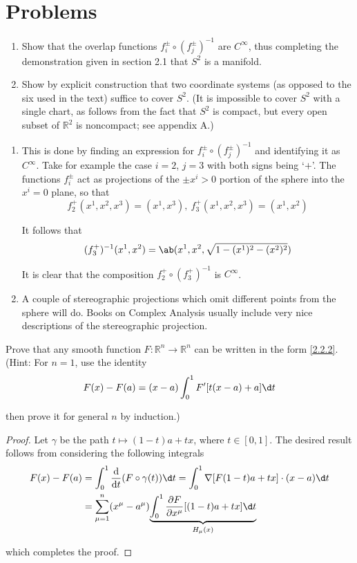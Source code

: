 \section*{Problems}
\begin{problem}\leavevmode
    \begin{enumerate}[label=(\alph*)]
        \item Show that the overlap functions $f_i^\pm\circ(f_j^\pm)^{-1}$ are $C^\infty$, thus completing the demonstration given in section 2.1 that $S^2$ is a manifold.
        \item Show by explicit construction that two coordinate systems (as opposed to the six used in the text) suffice to cover $S^2$. (It is impossible to cover $S^2$ with a single chart, as follows from the fact that $S^2$ is compact, but every open subset of $\mathbb{R}^2$ is noncompact; see appendix A.)
    \end{enumerate}
\end{problem}
\begin{solution}\leavevmode
    \begin{enumerate}[label=(\alph*)]
        \item This is done by finding an expression for $f_i^\pm\circ(f_j^\pm)^{-1}$ and identifying it as $C^\infty$. Take for example the case $i = 2$, $j = 3$ with both signs being `$+$'. The functions $f_i^\pm$ act as projections of the $\pm x^i>0$ portion of the sphere into the $x^i = 0$ plane, so that
        \[f_2^+(x^1,x^2,x^3)=(x^1,x^3),\ f_3^+(x^1,x^2,x^3)=(x^1,x^2)\]

        It follows that
        \[(f_3^+)^{-1}(x^1,x^2)=\ab(x^1,x^2,\sqrt{1-(x^1)^2-(x^2)^2})\]

        It is clear that the composition $f_2^+\circ(f_3^+)^{-1}$ is $C^\infty$.
        \item A couple of stereographic projections which omit different points from the sphere will do. Books on Complex Analysis usually include very nice descriptions of the stereographic projection.
    \end{enumerate}
\end{solution}

\begin{problem}
    Prove that any smooth function $F:\mathbb{R}^n\to\mathbb{R}^n$ can be written in the form \eqref{2.2.2}. (Hint: For $n = 1$, use the identity
    \[F(x)-F(a)=(x-a)\int_0^1F'[t(x-a)+a]\d t\]

    then prove it for general $n$ by induction.)
\end{problem}
\begin{proof}
    Let $\gamma$ be the path $t\longmapsto(1-t)a+tx$, where $t\in[0,1]$. The desired result follows from considering the following integrals
    \[\begin{aligned}
        F(x)-F(a)&=\int_0^1\odv{}t(F\circ\gamma(t))\d t=\int_0^1\nabla[F(1-t)a+tx]\cdot(x-a)\d t\\
        &=\sum_{\mu=1}^n(x^\mu-a^\mu)\underset{H_\mu(x)}{\underbrace{\int_0^1\pdv F{x^\mu}[(1-t)a+tx]\d t}}
    \end{aligned}
    \]

    which completes the proof.
\end{proof}

